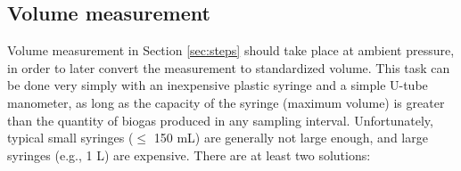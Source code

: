 \documentclass[]{article}
\begin{document}
\subsection{Volume measurement} \label{sec:volmeas}
Volume measurement in Section \ref{sec:steps} should take place at ambient pressure, in order to later convert the measurement to standardized volume.
This task can be done very simply with an inexpensive plastic syringe and a simple U-tube manometer, as long as the capacity of the syringe (maximum volume) is greater than the quantity of biogas produced in any sampling interval.
Unfortunately, typical small syringes ($\le$ 150 mL) are generally not large enough, and large syringes (e.g., 1 L) are expensive.
There are at least two solutions:
\end{document}
